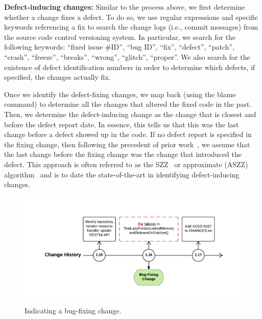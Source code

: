 \noindent\textbf{Defect-inducing changes:} Similar to the process above, we first determine whether a change fixes a defect. To do so, we use regular expressions and specific keywords referencing a fix to search the change logs (i.e., commit messages) from the source code control versioning system. In particular, we search for the following keywords: ``fixed issue \#ID'', ``bug ID'',  ``fix'',  ``defect'',  ``patch'', ``crash'',  ``freeze'', ``breaks'', ``wrong'', ``glitch'', ``proper''. We also search for the existence of defect identification numbers in order to determine which defects, if specified, the changes actually fix.

Once we identify the defect-fixing changes, we map back (using the blame command) to determine all the changes that altered the fixed code in the past. Then, we determine the defect-inducing change as the change that is closest and before the defect report date. In essence, this tells us that this was the last change before a defect showed up in the code. If no defect report is specified in the fixing change, then following the precedent of prior work~\cite{Kamei-tse-2013}, we assume that the last change before the fixing change was the change that introduced the defect. This approach is often referred to as the SZZ~\cite{sliwerski-msr-2005} or approximate (ASZZ) algorithm~\cite{Kamei-tse-2013} and is to date the state-of-the-art in identifying defect-inducing changes.


\begin{figure}[h]
	\centering
	\includegraphics[width=150mm]{figures/chapter3/bug-fixing-change}
	\caption{Indicating a bug-fixing change.}
	\label{fig:indicating-a-bug-fixing-change}
\end{figure}



